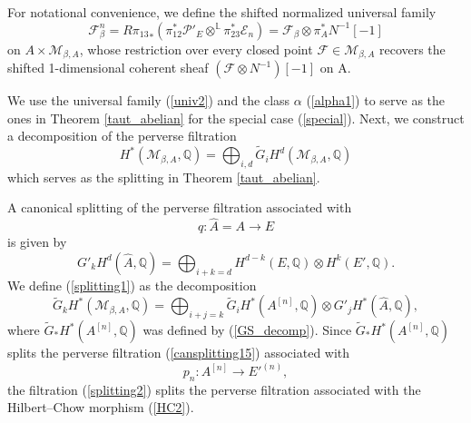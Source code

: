\documentclass[11pt]{amsart}
\theoremstyle{plain}
\theoremstyle{definition}
\theoremstyle{remark}
\newcommand{\BL}{{\mathbb{L}}}
\newcommand{\BQ}{{\mathbb{Q}}}
\newcommand{\CE}{{\mathcal E}}
\newcommand{\CF}{{\mathcal F}}
\newcommand{\CM}{{\mathcal M}}
\newcommand{\CP}{{\mathcal P}}
\begin{document}
For notational convenience, we define the shifted normalized universal family
\begin{equation}\label{Normalized_F}
\CF^{n}_\beta = {R\pi_{13}}_\ast \left( \pi_{12}^\ast {\CP'_{E}} \otimes^{\BL} \pi_{23}^\ast \CE_n \right) = \CF_\beta \otimes \pi_A^\ast N^{-1} [-1] 
\end{equation}
on $A\times \CM_{\beta,A}$, whose restriction over every closed point $\CF \in \CM_{\beta,A}$ recovers the shifted 1-dimensional coherent sheaf $\left(\CF \otimes N^{-1}\right)[-1]$ on A.


We use the universal family (\ref{univ2}) {and the class $\alpha$ (\ref{alpha1})} to serve as the ones in Theorem \ref{taut_abelian} for the special case (\ref{special}). Next, we construct a decomposition of the perverse filtration
 \begin{equation}\label{splitting1}
H^\ast(\CM_{\beta, A}, \BQ) = \bigoplus_{i,d} \widetilde{G}_iH^d(\CM_{\beta, A}, \BQ)
\end{equation}
which serves as the splitting in Theorem \ref{taut_abelian}.

A canonical splitting of the perverse filtration associated with
\[
q: \hat{A} =A \to E
\]
is given by 
\[
G'_kH^d(\hat{A}, \BQ) = \bigoplus_{i+k =d} H^{d-k}(E, \BQ)\otimes H^k(E',\BQ).
\]
We define (\ref{splitting1}) as the decomposition
\begin{equation}\label{splitting2}
\widetilde{G}_kH^\ast(\CM_{\beta, A}, \BQ) = \bigoplus_{i+j=k}  \widetilde{G}_i H^\ast(A^{[n]}, \BQ) \otimes G'_jH^\ast(\hat{A},\BQ),
\end{equation}
where
$\widetilde{G}_\ast H^\ast(A^{[n]}, \BQ)$ was defined by (\ref{GS_decomp}). Since $\widetilde{G}_\ast H^\ast(A^{[n]}, \BQ)$ splits the perverse filtration {(\ref{cansplitting15}) associated} with 
\[
p_n:  A^{[n]} \to E'^{(n)},
\]
the filtration (\ref{splitting2}) splits the perverse filtration associated with the Hilbert--Chow morphism (\ref{HC2}). 
\end{document}
